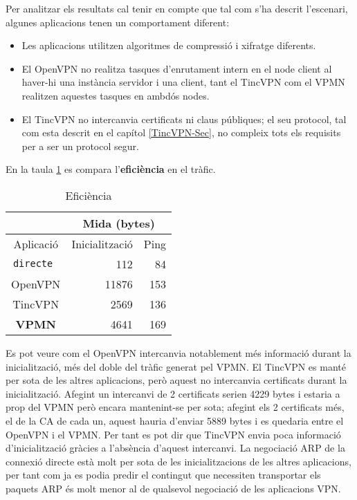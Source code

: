 Per analitzar els resultats cal tenir en compte que tal com s'ha descrit l'escenari, algunes aplicacions tenen un comportament diferent:
\begin{itemize}
\item Les aplicacions utilitzen algoritmes de compressió i xifratge diferents.
\item El OpenVPN no realitza tasques d'enrutament intern en el node client al haver-hi una instància servidor i una client, tant el TincVPN com el VPMN realitzen aquestes tasques en ambdós nodes.
\item El TincVPN no intercanvia certificats ni claus públiques; el seu protocol, tal com esta descrit en el capítol \ref{TincVPN-Sec}, no compleix tots els requisits per a ser un protocol segur.
\end{itemize}

En la taula \ref{T:efi} es compara l'\textbf{eficiència} en el tràfic.
\begin{table}[htb]
\begin{center}
\begin{tabular}{|c|r|r|}
\multicolumn{1}{c}{} & \multicolumn{2}{|c|}{Mida (bytes)} \\ \hline
Aplicació & Inicialització & Ping \\ \hline \hline
\tt directe & 112 & 84 \\ \hline
OpenVPN & 11876 & 153 \\ \hline
TincVPN & 2569 & 136 \\ \hline
\bf VPMN & 4641 & 169 \\ \hline
\end{tabular}
\end{center}
\begin{center}
\caption{Eficiència}
\label{T:efi}
\end{center}
\end{table}
Es pot veure com el OpenVPN intercanvia notablement més informació durant la inicialització, més del doble del tràfic generat pel VPMN.
El TincVPN es manté per sota de les altres aplicacions, però aquest no intercanvia certificats durant la inicialització. Afegint un intercanvi de 2 certificats serien 4229 bytes i estaria a prop del VPMN però encara mantenint-se per sota; afegint els 2 certificats més, el de la CA de cada un, aquest hauria d'enviar 5889 bytes i es quedaria entre el OpenVPN i el VPMN. Per tant es pot dir que TincVPN envia poca informació d'inicialització gràcies a l'absència d'aquest intercanvi.
La negociació ARP de la connexió directe està molt per sota de les inicialitzacions de les altres aplicacions, per tant com ja es podia predir el contingut que necessiten transportar els paquets ARP és molt menor al de qualsevol negociació de les aplicacions VPN.

